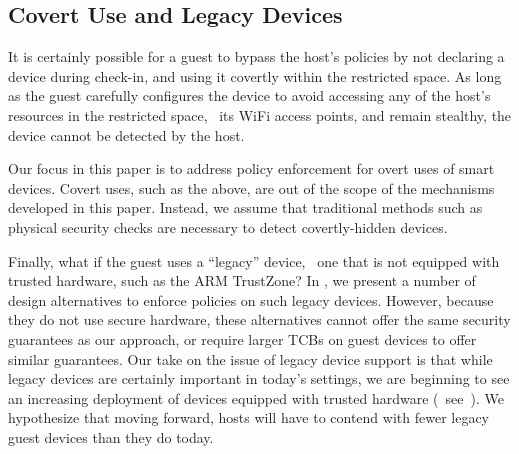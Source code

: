 
\subsection{Covert Use and Legacy Devices}
%
It is certainly possible for a guest to bypass the host's policies by not
declaring a device during check-in, and using it covertly within the restricted
space. As long as the guest carefully configures the device to avoid accessing
any of the host's resources in the restricted space, \eg~its WiFi access
points, and remain stealthy, the device cannot be detected by the host.

Our focus in this paper is to address policy enforcement for overt uses of
smart devices. Covert uses, such as the above, are out of the scope of the
mechanisms developed in this paper. Instead, we assume that traditional methods
such as physical security checks are necessary to detect covertly-hidden
devices.

Finally, what if the guest uses a ``legacy'' device, \ie~one that is not
equipped with trusted hardware, such as the ARM TrustZone? In
, we present a number of design alternatives to
enforce policies on such legacy devices.  However, because they do not use
secure hardware, these alternatives cannot offer the same security guarantees
as our approach, or require larger TCBs on guest devices to offer similar
guarantees. Our take on the issue of legacy device support is that while legacy
devices are certainly important in today's settings, we are beginning to see an
increasing deployment of devices equipped with trusted hardware
(\eg~see~\cite{knox:ccs14}). We hypothesize that moving forward, hosts will
have to contend with fewer legacy guest devices than they do today.

